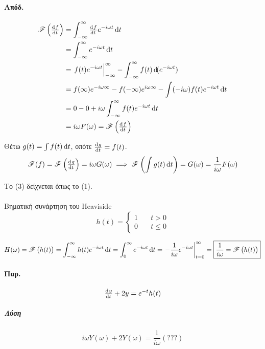 \documentclass[11pt,a4paper,titlepage,draft]{article}
\begin{document}
\paragraph{Απόδ.}
\begin{align*}
\mathscr{F}\left(\od{f}{t}\right) &= \int_{-\infty}^\infty \od{f}{t}e^{-i\omega t} \dif t
\\ &=
\int_{-\infty}^\infty e^{-i\omega t} \dif t
\\ &=
\left. f(t)e^{-i\omega t} \right|_{-\infty}^\infty
- \int_{-\infty}^\infty f(t) \dif(e^{-i\omega t})
\\ &=
f(\infty)e^{-i\omega\infty} - f(-\infty)e^{i\omega\infty} - \int (-i\omega)f(t)e^{-i\omega t}\dif t
\\ &= 0 - 0 + i\omega \int_{-\infty}^\infty f(t)e^{-i\omega t} \dif t \\
&= i\omega F(\omega) = \mathscr{F}\left(\od{f}{t}\right)
\end{align*}

Θέτω \(g(t)=\int f(t)\dif t\), οπότε \(\od{g}{t}=f(t)\).
\begin{align*}
\mathscr{F}(f) = \mathscr{F}\left(\od{g}{t}\right) = i\omega G(\omega) \implies
\mathscr{F}\left(\int g(t) \dif t\right) = G(\omega)=\frac{1}{i\omega}F(\omega)
\end{align*}

Το (3) δείχνεται όπως το (1).

\paragraph{}

\begin{defn*}{Βηματική συνάρτηση του \textlatin{Heaviside}}
\[
h(t) = \begin{cases}
1 \quad& t > 0\\
0 \quad& t \leq 0
\end{cases}
\]
\end{defn*}{}
\[
H(\omega)=\mathscr{F}\left(h(t)\right)
= \int_{-\infty}^\infty h(t)e^{-i\omega t} \dif t
= \int_{0}^\infty e^{-i\omega t} \dif t = \left. -\frac{1}{i\omega}e^{-i\omega t}\right|_{t=0}^\infty
= \boxed{
\frac{1}{i\omega}=\mathscr{F}\left(h(t)\right)
}
\]

\paragraph{Παρ.}

\[
\od{y}{t}+2y = e^{-t}h(t)
\]
\subparagraph{Λύση}
\[
i\omega Y(\omega)+2Y(\omega)=\frac{1}{i\omega} (???)
\]
\end{document}
